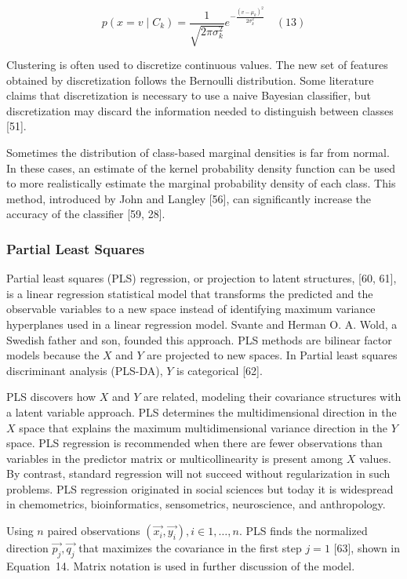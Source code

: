 \documentclass[preprint,12pt]{elsarticle}
\begin{document}
\begin{equation}
	p(x=v\mid C_{k}) = \frac{1}{\sqrt{2\pi \sigma_{k}^{2}}} e^{-\frac{{(v-\mu_{k})}^{2}}{2\sigma_{k}^{2}}}
	\quad\left(13\right)
\end{equation}

Clustering is often used to discretize continuous values. The new set of features obtained by discretization follows the Bernoulli distribution. Some literature claims that discretization is necessary to use a naive Bayesian classifier, but discretization may discard the information needed to distinguish between classes [51].

Sometimes the distribution of class-based marginal densities is far from normal. In these cases, an estimate of the kernel probability density function can be used to more realistically estimate the marginal probability density of each class. This method, introduced by John and Langley [56], can significantly increase the accuracy of the classifier [59, 28].

\subsubsection{Partial Least Squares}

Partial least squares (PLS) regression, or projection to latent structures, [60, 61], is a linear regression statistical model that transforms the predicted and the observable variables to a new space instead of identifying maximum variance hyperplanes used in a linear regression model. Svante and Herman O. A. Wold, a Swedish father and son, founded this approach. PLS methods are bilinear factor models because the $X$ and $Y$ are projected to new spaces. In Partial least squares discriminant analysis (PLS-DA), $Y$ is categorical [62].

PLS discovers how $X$ and $Y$ are related, modeling their covariance structures with a latent variable approach. PLS determines the multidimensional direction in the $X$ space that explains the maximum multidimensional variance direction in the $Y$ space. PLS regression is recommended when there are fewer observations than variables in the predictor matrix or multicollinearity is present among $X$ values. By contrast, standard regression will not succeed without regularization in such problems. PLS regression originated in social sciences but today it is widespread in chemometrics, bioinformatics, sensometrics, neuroscience, and anthropology.

Using $n$ paired observations $\left(\vec{x_{i}}, \vec{y_{i}}\right), i \in 1, \dots, n$. PLS finds the normalized direction $\vec{p_{j}}, \vec{q_{j}}$ that maximizes the covariance in the first step $j = 1$ [63], shown in Equation~14. Matrix notation is used in further discussion of the model.
\end{document}
